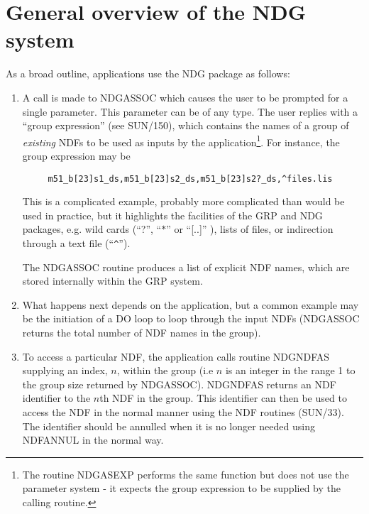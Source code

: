 \documentclass[twoside,11pt]{article}
\newcommand{\htmlref}[2]{#1}
\newcommand{\xref}[3]{#1}
\renewcommand{\_}{\texttt{\symbol{95}}}
\begin{document}
\section {General overview of the NDG\_ system}
As a broad outline, applications use the NDG\_ package as follows:

\begin{enumerate}

\item A call is made to \htmlref{NDG\_ASSOC}{NDG\_ASSOC} which causes the user
to be prompted for a single parameter. This parameter can be of any type.
The user replies with a ``group expression'' (see
\xref{SUN/150}{sun150}{}), which contains the names of a group of {\em
existing} NDFs to be used as inputs by the application\footnote{The routine
\htmlref{NDG\_ASEXP}{NDG\_ASEXP} performs the same function but does not
use the parameter system - it expects the group expression to be supplied by
the calling routine.}. For instance, the group expression may be

\begin{verbatim}
     m51_b[23]s1_ds,m51_b[23]s2_ds,m51_b[23]s2?_ds,^files.lis
\end{verbatim}

This is a complicated example, probably more complicated than would be
used in practice, but it highlights the facilities of the GRP and NDG
packages, e.g. wild cards (``?'', ``$*$'' or ``[..]'' ), lists of files,
or indirection through a text file (``\verb+^+'').

The \htmlref{NDG\_ASSOC}{NDG\_ASSOC} routine produces a list of explicit NDF names, which are stored
internally within the GRP system.

\item What happens next depends on the application, but a common example may be
the initiation of a DO loop to loop through the input NDFs (NDG\_ASSOC returns
the total number of NDF names in the group).

\item To access a particular NDF, the application calls routine \htmlref{NDG\_NDFAS}{NDG\_NDFAS}
supplying an index, $n$, within the group (i.e $n$ is an integer in the range 1
to the group size returned by NDG\_ASSOC). NDG\_NDFAS returns an NDF identifier
to the $n$th NDF in the group. This identifier can then be used to access the
NDF in the normal manner using the NDF\_ routines (\xref{SUN/33}{sun33}{}). The identifier
should be annulled when it is no longer needed using \xref{NDF\_ANNUL}{sun33}{NDF\_ANNUL} in the
normal way.


\end{enumerate}
\end{document}
